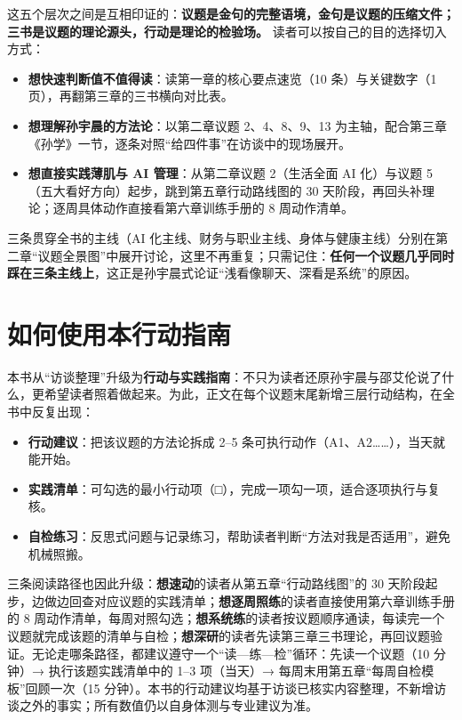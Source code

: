 这五个层次之间是互相印证的：\textbf{议题是金句的完整语境，金句是议题的压缩文件；三书是议题的理论源头，行动是理论的检验场。}
读者可以按自己的目的选择切入方式：

\begin{itemize}
\tightlist
\item
  \textbf{想快速判断值不值得读}：读第一章的核心要点速览（10
  条）与关键数字（1 页），再翻第三章的三书横向对比表。
\item
  \textbf{想理解孙宇晨的方法论}：以第二章议题 2、4、8、9、13
  为主轴，配合第三章《孙学》一节，逐条对照``给四件事''在访谈中的现场展开。
\item
  \textbf{想直接实践薄肌与 AI 管理}：从第二章议题 2（生活全面 AI
  化）与议题 5（五大看好方向）起步，跳到第五章行动路线图的 30
  天阶段，再回头补理论；逐周具体动作直接看第六章训练手册的 8
  周动作清单。
\end{itemize}

三条贯穿全书的主线（AI
化主线、财务与职业主线、身体与健康主线）分别在第二章``议题全景图''中展开讨论，这里不再重复；只需记住：\textbf{任何一个议题几乎同时踩在三条主线上}，这正是孙宇晨式论证``浅看像聊天、深看是系统''的原因。

\section{如何使用本行动指南}

本书从``访谈整理''升级为\textbf{行动与实践指南}：不只为读者还原孙宇晨与邵艾伦说了什么，更希望读者照着做起来。为此，正文在每个议题末尾新增三层行动结构，在全书中反复出现：

\begin{itemize}
\tightlist
\item
  \textbf{行动建议}：把该议题的方法论拆成 2--5
  条可执行动作（A1、A2\ldots\ldots），当天就能开始。
\item
  \textbf{实践清单}：可勾选的最小行动项（□），完成一项勾一项，适合逐项执行与复核。
\item
  \textbf{自检练习}：反思式问题与记录练习，帮助读者判断``方法对我是否适用''，避免机械照搬。
\end{itemize}

三条阅读路径也因此升级：\textbf{想速动}的读者从第五章``行动路线图''的 30
天阶段起步，边做边回查对应议题的实践清单；\textbf{想逐周照练}的读者直接使用第六章训练手册的
8
周动作清单，每周对照勾选；\textbf{想系统练}的读者按议题顺序通读，每读完一个议题就完成该题的清单与自检；\textbf{想深研}的读者先读第三章三书理论，再回议题验证。无论走哪条路径，都建议遵守一个``读---练---检''循环：先读一个议题（10
分钟）→ 执行该题实践清单中的 1--3 项（当天）→
每周末用第五章``每周自检模板''回顾一次（15
分钟）。本书的行动建议均基于访谈已核实内容整理，不新增访谈之外的事实；所有数值仍以自身体测与专业建议为准。

